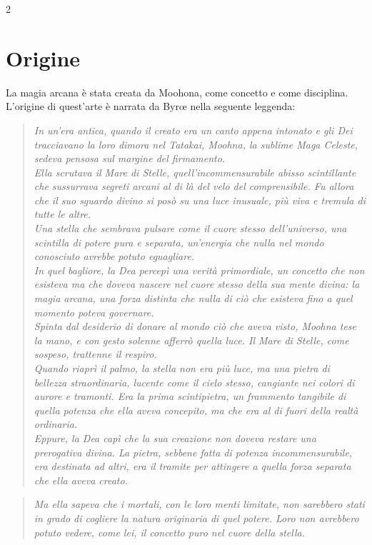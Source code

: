 \documentclass[10pt, a4paper]{report}
\begin{document}
\begin{multicols}{2}

\section{Origine} 
La magia arcana è stata creata da Moohona, come concetto e come disciplina. L'origine di quest'arte è narrata da Byrœ nella seguente leggenda:

\begin{verse}
	
\textit{In un'era antica, quando il creato era un canto appena intonato e gli Dei tracciavano la loro dimora nel Tatakai, Moohna, la sublime Maga Celeste, sedeva pensosa sul margine del firmamento.\\ Ella scrutava il Mare di Stelle, quell’incommensurabile abisso scintillante che sussurrava segreti arcani al di là del velo del comprensibile.
Fu allora che il suo sguardo divino si posò su una luce inusuale, più viva e tremula di tutte le altre.\\ Una stella che sembrava pulsare come il cuore stesso dell'universo, una scintilla di potere pura e separata, un'energia che nulla nel mondo conosciuto avrebbe potuto eguagliare.\\ In quel bagliore, la Dea percepì una verità primordiale, un concetto che non esisteva ma che doveva nascere nel cuore stesso della sua mente divina: la magia arcana, una forza distinta che nulla di ciò che esisteva fino a quel momento poteva governare.\\ Spinta dal desiderio di donare al mondo ciò che aveva visto, Moohna tese la mano, e con gesto solenne afferrò quella luce. Il Mare di Stelle, come sospeso, trattenne il respiro.\\ Quando riaprì il palmo, la stella non era più luce, ma una pietra di bellezza straordinaria, lucente come il cielo stesso, cangiante nei colori di aurore e tramonti. Era la prima scintipietra, un frammento tangibile di quella potenza che ella aveva concepito, ma che era al di fuori della realtà ordinaria.\\
Eppure, la Dea capì che la sua creazione non doveva restare una prerogativa divina. La pietra, sebbene fatta di potenza incommensurabile, era destinata ad altri, era il tramite per attingere a quella forza separata che ella aveva creato.}
\end{verse}
\newcolumn
\begin{verse}
\textit{Ma ella sapeva che i mortali, con le loro menti limitate, non sarebbero stati in grado di cogliere la natura originaria di quel potere. Loro non avrebbero potuto vedere, come lei, il concetto puro nel cuore della stella. \\
}
\end{verse}
\end{multicols}
\end{document}
